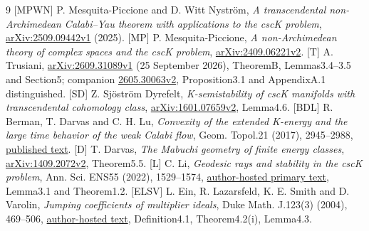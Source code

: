\documentclass[11pt]{article}
\begin{document}
\begin{thebibliography}{9}
[MPWN] P. Mesquita-Piccione and D. Witt Nystr\"om,
\emph{A transcendental non-Archimedean Calabi--Yau theorem with
applications to the cscK problem},
\href{https://arxiv.org/pdf/2509.09442v1}{arXiv:2509.09442v1} (2025).
[MP] P. Mesquita-Piccione,
\emph{A non-Archimedean theory of complex spaces and the cscK problem},
\href{https://arxiv.org/pdf/2409.06221v2}{arXiv:2409.06221v2}.
[T] A. Trusiani,
\href{https://arxiv.org/pdf/2609.31089v1}{arXiv:2609.31089v1}
(25 September 2026), TheoremB, Lemmas3.4--3.5 and Section5;
companion \href{https://arxiv.org/pdf/2605.30063v2}{2605.30063v2},
Proposition3.1 and AppendixA.1 distinguished.
[SD] Z. Sj\"ostr\"om Dyrefelt,
\emph{K-semistability of cscK manifolds with transcendental
cohomology class},
\href{https://arxiv.org/pdf/1601.07659v2}{arXiv:1601.07659v2}, Lemma4.6.
[BDL] R. Berman, T. Darvas and C. H. Lu,
\emph{Convexity of the extended K-energy and the large time behavior
of the weak Calabi flow}, Geom. Topol.21 (2017), 2945--2988,
\href{https://msp.org/gt/2017/21-5/gt-v21-n5-p08-s.pdf}{published text}.
[D] T. Darvas,
\emph{The Mabuchi geometry of finite energy classes},
\href{https://arxiv.org/pdf/1409.2072v2}{arXiv:1409.2072v2}, Theorem5.5.
[L] C. Li, \emph{Geodesic rays and stability in the cscK
problem}, Ann. Sci. ENS55 (2022), 1529--1574,
\href{https://sites.math.rutgers.edu/~cl1412/papers/maximal.pdf}
{author-hosted primary text}, Lemma3.1 and Theorem1.2.
[ELSV] L. Ein, R. Lazarsfeld, K. E. Smith and D. Varolin,
\emph{Jumping coefficients of multiplier ideals}, Duke Math. J.123(3)
(2004), 469--506,
\href{https://www.math.stonybrook.edu/~dror/paper-jump.pdf}
{author-hosted text}, Definition4.1, Theorem4.2(i), Lemma4.3.
\end{thebibliography}
\end{document}

